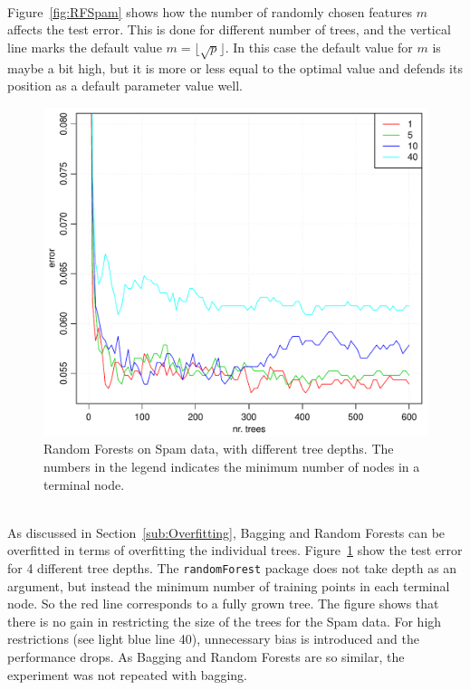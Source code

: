 \\
Figure~\ref{fig:RFSpam} shows how the number of randomly chosen features $m$ affects the test error. This is done for different number of trees, and the vertical line marks the default value $m = \lfloor \sqrt{p} \rfloor$. In this case the default value for $m$ is maybe a bit high, but it is more or less equal to the optimal value and defends its position as a default parameter value well. 
\\
\begin{figure}[htpb]
\begin{center}
    \includegraphics[scale=0.5]{./figures/RFTreeDepth.pdf}
\end{center}
\caption{Random Forests on Spam data, with different tree depths. The numbers in the legend indicates the minimum number of nodes in a terminal node.}
\label{fig:RFTreeDepth}
\end{figure}
\\
As discussed in Section~\ref{sub:Overfitting}, Bagging and Random Forests can be overfitted in terms of overfitting the individual trees. Figure~\ref{fig:RFTreeDepth} show the test error for 4 different tree depths. The \verb+randomForest+ package does not take depth as an argument, but instead the minimum number of training points in each terminal node. So the red line corresponds to a fully grown tree. The figure shows that there is no gain in restricting the size of the trees for the Spam data. For high restrictions (see light blue line 40), unnecessary bias is introduced and the performance drops.  As Bagging and Random Forests are so similar, the experiment was not repeated with bagging.
